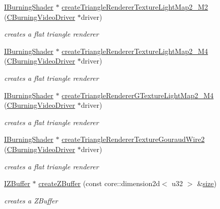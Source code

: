 \begin{DoxyCompactItemize}
\hyperlink{classirr_1_1video_1_1_i_burning_shader}{I\-Burning\-Shader} $\ast$ \hyperlink{namespaceirr_1_1video_acbd45ceecacdf2f04b47bc334db7ec29}{create\-Triangle\-Renderer\-Texture\-Light\-Map2\-\_\-\-M2} (\hyperlink{classirr_1_1video_1_1_c_burning_video_driver}{C\-Burning\-Video\-Driver} $\ast$driver)
\begin{DoxyCompactList}\small\item\em creates a flat triangle renderer \end{DoxyCompactList}\item 
\hyperlink{classirr_1_1video_1_1_i_burning_shader}{I\-Burning\-Shader} $\ast$ \hyperlink{namespaceirr_1_1video_a4b9aaff35e558f4ef530250ac2570823}{create\-Triangle\-Renderer\-Texture\-Light\-Map2\-\_\-\-M4} (\hyperlink{classirr_1_1video_1_1_c_burning_video_driver}{C\-Burning\-Video\-Driver} $\ast$driver)
\begin{DoxyCompactList}\small\item\em creates a flat triangle renderer \end{DoxyCompactList}\item 
\hyperlink{classirr_1_1video_1_1_i_burning_shader}{I\-Burning\-Shader} $\ast$ \hyperlink{namespaceirr_1_1video_a5c6cca670f3291f9024b5eb7f916bec4}{create\-Triangle\-Renderer\-G\-Texture\-Light\-Map2\-\_\-\-M4} (\hyperlink{classirr_1_1video_1_1_c_burning_video_driver}{C\-Burning\-Video\-Driver} $\ast$driver)
\begin{DoxyCompactList}\small\item\em creates a flat triangle renderer \end{DoxyCompactList}\item 
\hyperlink{classirr_1_1video_1_1_i_burning_shader}{I\-Burning\-Shader} $\ast$ \hyperlink{namespaceirr_1_1video_a86d6d9749b687b130c4c05c6e0352ba5}{create\-Triangle\-Renderer\-Texture\-Gouraud\-Wire2} (\hyperlink{classirr_1_1video_1_1_c_burning_video_driver}{C\-Burning\-Video\-Driver} $\ast$driver)
\begin{DoxyCompactList}\small\item\em creates a flat triangle renderer \end{DoxyCompactList}\item 
\hyperlink{classirr_1_1video_1_1_i_z_buffer}{I\-Z\-Buffer} $\ast$ \hyperlink{namespaceirr_1_1video_ae97e3b8929e63f5c2383f61dbd45b1d9}{create\-Z\-Buffer} (const core\-::dimension2d$<$ u32 $>$ \&\hyperlink{glext_8h_a3d1e3edfcf61ca2d831883e1afbad89e}{size})
\begin{DoxyCompactList}\small\item\em creates a Z\-Buffer \end{DoxyCompactList}\item 

\end{DoxyCompactItemize}
